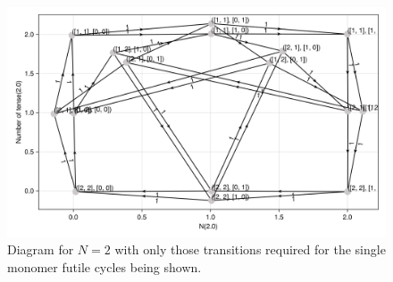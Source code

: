 \documentclass[11pt]{article}
\begin{document}
\begin{figure}[H]
    \includegraphics[width=\textwidth]{../../plots/fcs_B=1_C=2_N=2_version=2.5.png}
    \caption{
        Diagram for $N=2$ with only those transitions required for the single monomer futile cycles being shown.
    }\label{fig:N2fcs}
\end{figure}


\newpage
\end{document}

